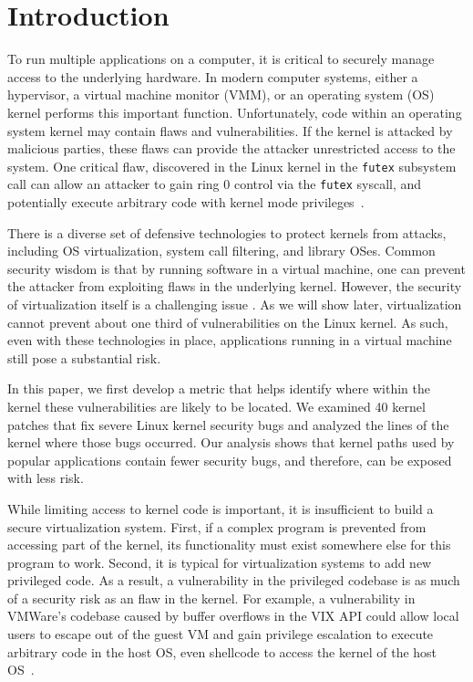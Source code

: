 \section{Introduction}
\label{sec.introduction}

To run multiple applications on a computer, it is critical to securely
manage access to the underlying hardware. In modern computer systems,
either a hypervisor, a virtual machine monitor (VMM), or an 
operating system (OS) kernel performs this important function. Unfortunately, code within an operating system kernel
may contain flaws and vulnerabilities. If the kernel is attacked by malicious parties, these flaws can provide the attacker unrestricted access to the system. One critical flaw, discovered in the Linux kernel in the \texttt{futex} subsystem call can allow an attacker to gain ring 0 control via the \texttt{futex} syscall, and potentially execute arbitrary code
with kernel mode privileges~\cite{CVE-2014-3153}. 

There is a diverse set of defensive technologies to protect kernels from 
attacks, including OS virtualization, system call filtering, and library OSes.
Common security wisdom is that by running software in a virtual machine, 
one can prevent the attacker from exploiting flaws in the underlying kernel.  However, the security of virtualization itself is a 
challenging issue \cite{Tal}. As we will show later, virtualization cannot prevent about one third of vulnerabilities on the Linux kernel. As such, even with these technologies in place, applications running in a virtual machine still pose a substantial risk.

In this paper, we first develop a metric that helps identify where
within the kernel these vulnerabilities are likely to be located. We
examined 40 kernel patches that fix severe Linux kernel security bugs
and analyzed the lines of the kernel where those bugs occurred.  Our
analysis shows that kernel paths used by popular applications contain fewer
security bugs, and therefore, can be exposed with less risk. 

While limiting access to kernel code is important, it is
insufficient to build a secure virtualization system.  First, if a complex
program is prevented from accessing part of the kernel, its functionality 
must exist somewhere else for this program to work.  Second, it is 
typical for virtualization systems to add new privileged code.
As a result, a vulnerability in the privileged codebase is as much of a security 
risk as an flaw in the kernel.  %
For example, 
a vulnerability in VMWare's codebase caused by buffer overflows in the VIX
API could allow local users to escape out of the guest VM and 
gain privilege escalation to execute arbitrary code in the host
OS, even shellcode to access the kernel of the host OS~\cite{CVE-2008-2100}.  


